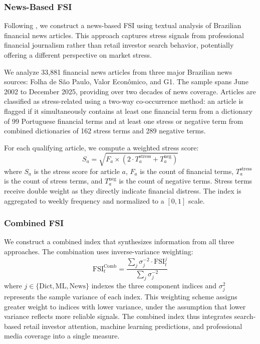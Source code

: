\subsubsection{News-Based FSI}

Following \cite{baker2016measuring}, we construct a news-based FSI using textual analysis of Brazilian financial news articles. This approach captures stress signals from professional financial journalism rather than retail investor search behavior, potentially offering a different perspective on market stress.

We analyze 33,881 financial news articles from three major Brazilian news sources: Folha de S\~ao Paulo, Valor Econ\^omico, and G1. The sample spans June 2002 to December 2025, providing over two decades of news coverage. Articles are classified as stress-related using a two-way co-occurrence method: an article is flagged if it simultaneously contains at least one financial term from a dictionary of 99 Portuguese financial terms and at least one stress or negative term from combined dictionaries of 162 stress terms and 289 negative terms.

For each qualifying article, we compute a weighted stress score:
\begin{equation}\label{eq:news_score}
    S_a = \sqrt{F_a \times (2 \cdot T_a^{\text{stress}} + T_a^{\text{neg}})}
\end{equation}
where $S_a$ is the stress score for article $a$, $F_a$ is the count of financial terms, $T_a^{\text{stress}}$ is the count of stress terms, and $T_a^{\text{neg}}$ is the count of negative terms. Stress terms receive double weight as they directly indicate financial distress. The index is aggregated to weekly frequency and normalized to a $[0, 1]$ scale.

\subsubsection{Combined FSI}

We construct a combined index that synthesizes information from all three approaches. The combination uses inverse-variance weighting:
\begin{equation}\label{eq:combined}
    \text{FSI}_t^{\text{Comb}} = \frac{\sum_{j} \sigma_{j}^{-2} \cdot \text{FSI}_t^{j}}{\sum_{j} \sigma_{j}^{-2}}
\end{equation}
where $j \in \{\text{Dict}, \text{ML}, \text{News}\}$ indexes the three component indices and $\sigma_{j}^2$ represents the sample variance of each index. This weighting scheme assigns greater weight to indices with lower variance, under the assumption that lower variance reflects more reliable signals. The combined index thus integrates search-based retail investor attention, machine learning predictions, and professional media coverage into a single measure.

